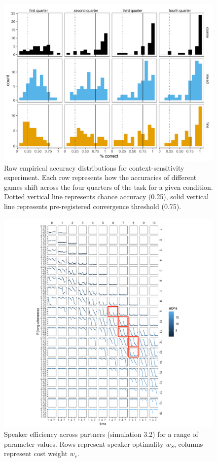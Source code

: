 \documentclass[11pt, floatsintext]{apa6}
\begin{document}
 \begin{figure}
\centering
    \includegraphics[scale=.9]{exp2-acc-grid_cleaned.pdf}
  \caption{Raw empirical accuracy distributions for context-sensitivity experiment. Each row represents how the accuracies of different games shift across the four quarters of the task for a given condition. Dotted vertical line represents chance accuracy (0.25), solid vertical line represents pre-registered convergence threshold (0.75).}
  \label{fig:full_accuracy_grid}
\end{figure}

 \begin{figure}
\centering
    \includegraphics[scale=.8]{reduction_grid_search.pdf}
  \caption{Speaker efficiency across partners (simulation 3.2) for a range of parameter values. Rows represent speaker optimality $w_S$, columns represent cost weight $w_c$.}
  \label{fig:partnerspecificity_grid}
\end{figure}
\end{document}
